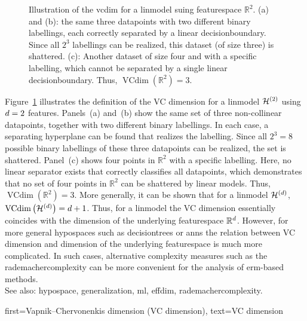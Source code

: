 {{\begin{figure}[h]
	\caption{Illustration of the \gls{vcdim} for a \gls{linmodel} suing \gls{featurespace} $\mathbb{R}^2$. 
		(a) and (b): the same three \glspl{datapoint} with two different binary labellings, each 
		correctly separated by a linear \gls{decisionboundary}. Since all $2^3$ labellings can be realized, 
		this \gls{dataset} (of size three) is shattered. 
		(c): Another \gls{dataset} of size four and with a specific labelling, which cannot be separated 
		by a single linear \gls{decisionboundary}. 
		Thus, $\operatorname{VCdim}(\mathbb{R}^2) = 3$.}
	\label{fig:vcdim}
\end{figure}
Figure~\ref{fig:vcdim} illustrates the definition of the VC dimension for a \gls{linmodel} $\mathcal{H}^{(2)}$ using 
$d=2$ \glspl{feature}. 
Panels~(a) and~(b) show the same set of three non-collinear \glspl{datapoint}, 
together with two different binary labellings. In each case, a separating hyperplane 
can be found that realizes the labelling. Since all $2^3 = 8$ possible binary labellings 
of these three \glspl{datapoint} can be realized, the set is shattered.
Panel~(c) shows four points in $\mathbb{R}^2$ with a specific labelling. 
Here, no linear separator exists that correctly classifies all \glspl{datapoint}, 
which demonstrates that no set of four points in $\mathbb{R}^2$ can be shattered 
by linear models. Thus, $\operatorname{VCdim}(\mathbb{R}^2) = 3$.  
More generally, it can be shown that for a \gls{linmodel} $\mathcal{H}^{(d)}$, 
$\operatorname{VCdim}\big(\mathcal{H}^{(d)}\big) = d+1$. Thus, for a \gls{linmodel} 
the VC dimension essentially coincides with the dimension of the underlying \gls{featurespace} $\mathbb{R}^{d}$. 
However, for more general \glspl{hypospace} such as \glspl{decisiontree} or \glspl{ann} the 
relation between VC dimension and dimension of the underlying \gls{featurespace} is much more 
complicated. In such cases, alternative complexity measures such as the \gls{rademachercomplexity} 
can be more convenient for the analysis of \gls{erm}-based methods.
\\
See also: \gls{hypospace},  \gls{generalization}, \gls{ml}, \gls{effdim}, \gls{rademachercomplexity}.}
	first={Vapnik–Chervonenkis dimension (VC dimension)},
	text={VC dimension}
}

